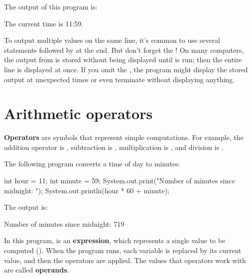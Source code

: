 The output of this program is:

\begin{stdout}
The current time is 11:59.
\end{stdout}

To output multiple values on the same line, it's common to use several  statements followed by  at the end.
But don't forget the !
On many computers, the output from  is stored without being displayed until  is run; then the entire line is displayed at once.
If you omit the , the program might display the stored output at unexpected times or even terminate without displaying anything.


\section{Arithmetic operators}
\label{sec:arithops}



{\bf Operators} are symbols that represent simple computations.
For example, the addition operator is \java{+}, subtraction is \java{-}, multiplication is \java{*}, and division is \java{/}.

The following program converts a time of day to minutes:

\begin{code}
int hour = 11;
int minute = 59;
System.out.print("Number of minutes since midnight: ");
System.out.println(hour * 60 + minute);
\end{code}

The output is:

\begin{stdout}
Number of minutes since midnight: 719
\end{stdout}


In this program,  is an {\bf expression}, which represents a single value to be computed ().
When the program runs, each variable is replaced by its current value, and then the operators are applied.
The values that operators work with are called {\bf operands}.

